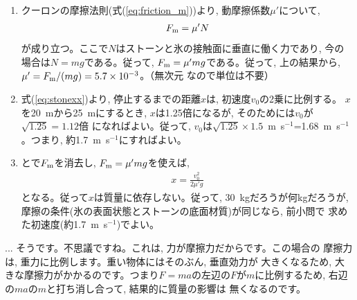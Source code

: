 \begin{enumerate}
\item クーロンの摩擦法則(式(\ref{eq:friction_m}))より, 動摩擦係数$\mu'$について, 
\begin{eqnarray}
F_{\text m}=\mu' N\label{eq:curling_Fm}
\end{eqnarray}
が成り立つ。ここで$N$はストーンと氷の接触面に垂直に働く力であり, 今の場合は$N=mg$である。従って, 
$F_{\text m}=\mu' mg$である。従って, 上の結果から, 
$\mu'=F_{\text m}/(mg)=5.7\times10^{-3}$。（無次元
なので単位は不要）
\item 式(\ref{eq:stonexx})より, 停止するまでの距離$x$は, 初速度$v_0$の2乗に比例する。
$x$を20~mから25~mにするとき, $x$は1.25倍になるが, そのためには$v_0$が$\sqrt{1.25}=1.12$倍
になればよい。従って, $v_0$は$\sqrt{1.25}\times1.5$~m~s$^{-1}$=1.68~m~s$^{-1}$。つまり, 約1.7~m~s$^{-1}$にすればよい。
\item {}とで$F_{\text m}$を消去し, $F_{\text m}=\mu' mg$を使えば, 
\begin{eqnarray}
x=\frac{v_0^2}{2\mu'g}\label{eq:stonexx2}
\end{eqnarray}
となる。従って$x$は質量に依存しない。従って, 30~kgだろうが何kgだろうが, 
摩擦の条件(氷の表面状態とストーンの底面材質)が同じなら, 前小問で
求めた初速度(約1.7~m~s$^{-1}$)でよい。
\end{enumerate}
\vspace{0.2cm}

\begin{faq}{\small{}
... そうです。不思議ですね。これは, 力が摩擦力だからです。この場合の
摩擦力は, 重力に比例します。重い物体にはそのぶん, 垂直効力が
大きくなるため, 大きな摩擦力がかかるのです。つまり$F=ma$の左辺の$F$が$m$に比例するため, 
右辺の$ma$の$m$と打ち消し合って, 結果的に質量の影響は
無くなるのです。}\end{faq}\mv



